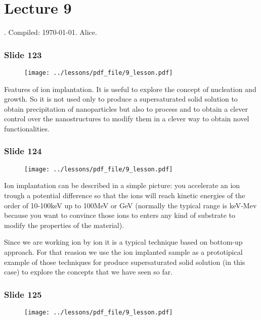 \documentclass[../main/main.tex]{subfiles}
\begin{document}
\section{Lecture 9}
 . Compiled:  \today. Alice.

\subsubsection{Slide 123}

\begin{figure}[h!]
\centering
\texttt{[image: ../lessons/pdf\_file/9\_lesson.pdf]}
\end{figure}

Features of ion implantation. It is useful to explore the concept of nucleation and growth. So it is not used only to produce a supersaturated solid solution to obtain precipitation of nanoparticles but also to process and to obtain a clever control over the nanostructures to modify them in a clever way to obtain novel functionalities.

\newpage \subsubsection{Slide 124}

\begin{figure}[h!]
\centering
\texttt{[image: ../lessons/pdf\_file/9\_lesson.pdf]}
\end{figure}

Ion implantation can be described in a simple picture: you accelerate an ion trough a potential difference so that the ions will reach kinetic energies of the order of 10-100keV up to 100MeV or GeV (normally the typical range is keV-Mev because you want to convince those ions to enters any kind of substrate to modify the properties of the material).

Since we are working ion by ion it is a typical technique based on bottom-up approach. For that reasion we use the ion implanted sample as a prototipical example of those techniques for produce supersaturated solid solution (in this case) to explore the concepts that we have seen so far.

\newpage

\subsubsection{Slide 125}

\begin{figure}[h!]
\centering
\texttt{[image: ../lessons/pdf\_file/9\_lesson.pdf]}
\end{figure}
\end{document}
